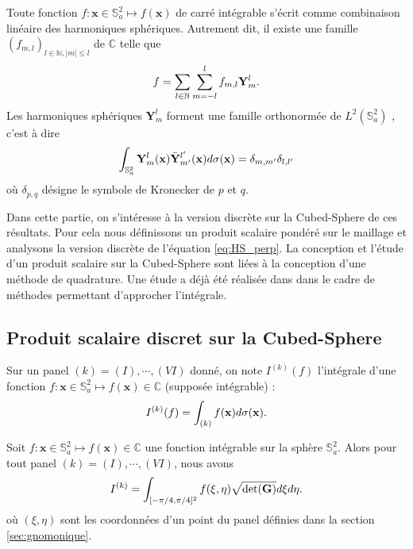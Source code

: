 Toute fonction $f : \mathbf{x} \in \mathbb{S}_a^2 \mapsto f(\mathbf{x})$ de carré intégrable s'écrit comme combinaison linéaire des harmoniques sphériques. Autrement dit, il existe une famille $(f_{m,l})_{l \in \mathbb{N}, |m| \leq l}$ de $\mathbb{C}$ telle que
\begin{equation}
f = \displaystyle\sum\limits_{l \in \mathbb{N}} \displaystyle\sum\limits_{m= -l}^l f_{m,l} \mathbf{Y}^l_m.
\end{equation}
Les harmoniques sphériques $\mathbf{Y}^l_m$ forment une famille orthonormée de $L^2(\mathbb{S}^2_a)$ \cite{Atkinson2012}, c'est à dire
\begin{equation}
\displaystyle\int_{\mathbb{S}_a^2} \mathbf{Y}^l_m(\mathbf{x}) \bar{\mathbf{Y}}^{l'}_{m'}(\mathbf{x}) d \sigma (\mathbf{x}) = \delta_{m, m'}\delta_{l, l'}
\label{eq:HS_perp}
\end{equation}
où $\delta_{p,q}$ désigne le symbole de Kronecker de $p$ et $q$.

Dans cette partie, on s'intéresse à la version discrète sur la Cubed-Sphere de ces résultats. Pour cela nous définissons un produit scalaire pondéré sur le maillage et analysons la version discrète de l'équation \eqref{eq:HS_perp}. La conception et l'étude d'un produit scalaire sur la Cubed-Sphere sont liées à la conception d'une méthode de quadrature. Une étude a déjà été réalisée dans \cite{Portelenelle2018} dans le cadre de méthodes permettant d'approcher l'intégrale.











\subsection{Produit scalaire discret sur la Cubed-Sphere}

Sur un panel $(k) = (I), \cdots , (VI)$ donné, on note $I^{(k)}(f)$ l'intégrale d'une fonction $f : \mathbf{x} \in \mathbb{S}_a^2 \mapsto f(\mathbf{x}) \in \mathbb{C}$ (supposée intégrable) :
\begin{equation}
I^{(k)}(f) = \displaystyle\int_{(k)}f(\mathbf{x}) d\sigma(\mathbf{x}).
\end{equation}

\begin{proposition}
Soit  $f : \mathbf{x} \in \mathbb{S}_a^2 \mapsto f(\mathbf{x}) \in \mathbb{C}$ une fonction intégrable sur la sphère $\mathbb{S}_a^2$. Alors pour tout panel $(k)=(I), \cdots, (VI)$, nous avons
\begin{equation}
I^{(k)} = \displaystyle\int_{[-\pi/4, \pi/4]^2} f(\xi, \eta) \sqrt{\det (\mathbf{G})} d\xi d\eta.
\end{equation}
où $(\xi, \eta)$ sont les coordonnées d'un point du panel définies dans la section \ref{sec:gnomonique}.
\end{proposition}

